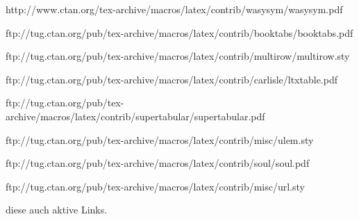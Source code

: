 http://www.ctan.org/tex-archive/macros/latex/contrib/wasysym/wasysym.pdf



%
ftp://tug.ctan.org/pub/tex-archive/macros/latex/contrib/booktabs/booktabs.pdf
\usepackage{booktabs}
%
%
ftp://tug.ctan.org/pub/tex-archive/macros/latex/contrib/multirow/multirow.sty
\usepackage{multirow} %
%
\usepackage{dcolumn} %



ftp://tug.ctan.org/pub/tex-archive/macros/latex/contrib/carlisle/ltxtable.pdf


ftp://tug.ctan.org/pub/tex-archive/macros/latex/contrib/supertabular/supertabular.pdf



%
ftp://tug.ctan.org/pub/tex-archive/macros/latex/contrib/misc/ulem.sty
\usepackage[normalem]{ulem} %
ftp://tug.ctan.org/pub/tex-archive/macros/latex/contrib/soul/soul.pdf
\usepackage{soul} %
ftp://tug.ctan.org/pub/tex-archive/macros/latex/contrib/misc/url.sty
\usepackage{url} %
diese auch aktive Links.

